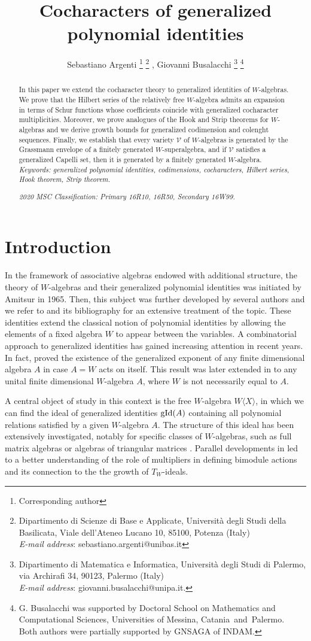 \documentclass{article}
\title{Cocharacters of generalized polynomial identities}
\author{
Sebastiano Argenti \footnote{Corresponding author}  \footnote{Dipartimento di Scienze di Base e Applicate, Universit\`{a} degli Studi della Basilicata, Viale dell'Ateneo Lucano 10, 85100, Potenza (Italy) \\ {\em E-mail address}: sebastiano.argenti@unibas.it} , 
Giovanni Busalacchi \footnote{Dipartimento di Matematica e Informatica, Universit\`{a} degli Studi di Palermo, via Archirafi 34, 90123, Palermo (Italy) \\ {\em E-mail address}: giovanni.busalacchi@unipa.it. } \footnote{ G. Busalacchi was supported by
Doctoral School on Mathematics and Computational Sciences, Universities of Messina, Catania and Palermo. \\
Both authors were partially supported by GNSAGA of INDAM.}
}
\date{}
\DeclareMathOperator{\gid}{\textnormal{gId}}
\begin{document}
\maketitle

\begin{abstract}
In this paper we extend the cocharacter theory to generalized identities of $W$-algebras. We prove that the Hilbert series of the relatively free $W$-algebra admits an expansion in terms of Schur functions whose coefficients coincide with generalized cocharacter multiplicities. Moreover, we prove analogues of the Hook and Strip theorems for $W$-algebras and we derive growth bounds for generalized codimension and colenght sequences. Finally, we establish that every variety $\mathcal{V}$ of $W$-algebras is generated by the Grassmann envelope of a finitely generated $W$-superalgebra, and if $\mathcal{V}$ satisfies a generalized Capelli set, then it is generated by a finitely generated $W$-algebra.\\
    
    {\it Keywords: generalized polynomial identities, codimensions, cocharacters, Hilbert series, Hook theorem, Strip theorem.}
    
    {\it 2020 MSC Classification: Primary 16R10, 16R50, Secondary 16W99.}
\end{abstract}

\section{Introduction}
In the framework of associative algebras endowed with additional structure, the theory of $W$-algebras and their generalized polynomial identities was initiated by Amitsur \cite{AM1} in 1965. Then, this subject was further developed by several authors and we refer to \cite{BMM96} and its bibliography for an extensive treatment of the topic. These identities extend the classical notion of polynomial identities by allowing the elements of a fixed algebra $W$ to appear between the variables. A combinatorial approach to generalized identities has gained increasing attention in recent years. In fact, \cite{Gor10} proved the existence of the generalized exponent of any finite dimensional algebra $A$ in case $A=W$ acts on itself. This result was later extended in \cite{MR25b} to any unital finite dimensional $W$-algebra $A$, where $W$ is not necessarily equal to $A$.

A central object of study in this context is the free $W$-algebra $W\langle X \rangle$, in which we can find the ideal of generalized identities $\gid (A)$ containing all polynomial relations satisfied by a given $W$-algebra $A$. The structure of this ideal has been extensively investigated, notably for specific classes of $W$-algebras, such as full matrix algebras \cite{BS15} or algebras of triangular matrices \cite{MR25a}.
Parallel developments in \cite{MR25b} led to a better understanding of the role of multipliers in defining bimodule actions and its connection to the the growth of $T_W$-ideals.
\end{document}
